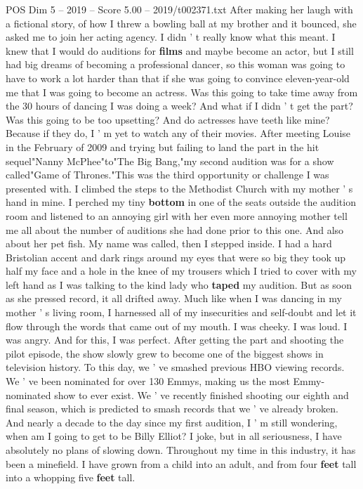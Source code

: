 \begin{textsample}{POS Dim 5 – 2019 – Score 5.00 – 2019/t002371.txt}
After making her laugh with a fictional story, of how I threw a bowling ball at my brother and it bounced, she asked me to join her acting agency.
I didn ' t really know what this meant.
I knew that I would do auditions for \textbf{films} and maybe become an actor, but I still had big dreams of becoming a professional dancer, so this woman was going to have to work a lot harder than that if she was going to convince eleven-year-old me that I was going to become an actress.
Was this going to take time away from the 30 hours of dancing I was doing a week?
And what if I didn ' t get the part?
Was this going to be too upsetting?
And do actresses have teeth like mine?
Because if they do, I ' m yet to watch any of their movies.
After meeting Louise in the February of 2009 and trying but failing to land the part in the hit sequel"Nanny McPhee"to"The Big Bang,"my second audition was for a show called"Game of Thrones."This was the third opportunity or challenge I was presented with.
I climbed the steps to the Methodist Church with my mother ' s hand in mine.
I perched my tiny \textbf{bottom} in one of the seats outside the audition room and listened to an annoying girl with her even more annoying mother tell me all about the number of auditions she had done prior to this one.
And also about her pet fish.
My name was called, then I stepped inside.
I had a hard Bristolian accent and dark rings around my eyes that were so big they took up half my face and a hole in the knee of my trousers which I tried to cover with my left hand as I was talking to the kind lady who \textbf{taped} my audition.
But as soon as she pressed record, it all drifted away.
Much like when I was dancing in my mother ' s living room, I harnessed all of my insecurities and self-doubt and let it flow through the words that came out of my mouth.
I was cheeky.
I was loud.
I was angry.
And for this, I was perfect.
After getting the part and shooting the pilot episode, the show slowly grew to become one of the biggest shows in television history.
To this day, we ' ve smashed previous HBO viewing records.
We ' ve been nominated for over 130 Emmys, making us the most Emmy-nominated show to ever exist.
We ' ve recently finished shooting our eighth and final season, which is predicted to smash records that we ' ve already broken.
And nearly a decade to the day since my first audition, I ' m still wondering, when am I going to get to be Billy Elliot?
I joke, but in all seriousness, I have absolutely no plans of slowing down.
Throughout my time in this industry, it has been a minefield.
I have grown from a child into an adult, and from four \textbf{feet} tall into a whopping five \textbf{feet} tall.

\end{textsample}
